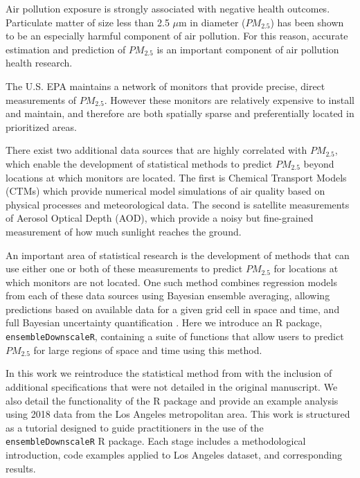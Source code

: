 \documentclass[12pt]{article}
\begin{document}
Air pollution exposure is strongly associated with negative health outcomes. 
Particulate matter of size less than 2.5 $\mu$m in diameter ($PM_{2.5}$) has been shown to be an especially harmful component of air pollution. 
For this reason, accurate estimation and prediction of $PM_{2.5}$ is an important component of air pollution health research.  

The U.S. EPA maintains a network of monitors that provide precise, direct measurements of $PM_{2.5}$. 
However these monitors are relatively expensive to install and maintain, and therefore are both spatially sparse and preferentially located in prioritized areas. 

There exist two additional data sources that are highly correlated with $PM_{2.5}$, which enable the development of statistical methods to predict $PM_{2.5}$ beyond locations at which monitors are located. 
The first is Chemical Transport Models (CTMs) which provide numerical model simulations of air quality based on physical processes and meteorological data. 
The second is satellite measurements of Aerosol Optical Depth (AOD), which provide a noisy but fine-grained measurement of how much sunlight reaches the ground. 



An important area of statistical research is the development of methods that can use either one or both of these measurements to predict $PM_{2.5}$ for locations at which monitors are not located. 
One such method combines regression models from each of these data sources using Bayesian ensemble averaging, allowing predictions based on available data for a given grid cell in space and time, and full Bayesian uncertainty quantification \cite{murray2019}. 
Here we introduce an R package, \texttt{ensembleDownscaleR}, containing a suite of functions that allow users to predict $PM_{2.5}$ for large regions of space and time using this method.

In this work we reintroduce the statistical method from \cite{murray2019} with the inclusion of additional specifications that were not detailed in the original manuscript. 
We also detail the functionality of the R package and provide an example analysis using 2018 data from the Los Angeles metropolitan area. 
This work is structured as a tutorial designed to guide practitioners in the use of the \texttt{ensembleDownscaleR} R package. 
Each stage includes a methodological introduction, code examples applied to Los Angeles dataset, and corresponding results. 
\end{document}
